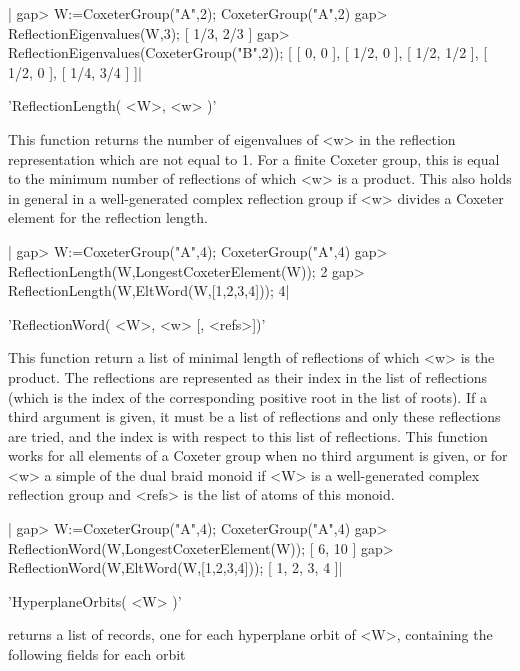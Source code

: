 |    gap> W:=CoxeterGroup("A",2);
    CoxeterGroup("A",2)
    gap> ReflectionEigenvalues(W,3);
    [ 1/3, 2/3 ]
    gap> ReflectionEigenvalues(CoxeterGroup("B",2));
    [ [ 0, 0 ], [ 1/2, 0 ], [ 1/2, 1/2 ], [ 1/2, 0 ], [ 1/4, 3/4 ] ]|


'ReflectionLength( <W>, <w> )'

This  function returns the  number of eigenvalues  of <w> in the reflection
representation  which are not equal to 1.  For a finite Coxeter group, this
is  equal to the minimum  number of reflections of  which <w> is a product.
This  also holds in general in a well-generated complex reflection group if
<w> divides a Coxeter element for the reflection length.

|    gap> W:=CoxeterGroup("A",4);
    CoxeterGroup("A",4)
    gap> ReflectionLength(W,LongestCoxeterElement(W));
    2
    gap> ReflectionLength(W,EltWord(W,[1,2,3,4]));
    4|


'ReflectionWord( <W>, <w> [, <refs>])'

This  function return a list of minimal  length of reflections of which <w>
is  the product. The reflections are represented as their index in the list
of  reflections (which is  the index of  the corresponding positive root in
the  list of roots).  If a third  argument is given,  it must be  a list of
reflections  and only  these reflections  are tried,  and the index is with
respect  to this list of reflections.  This function works for all elements
of  a Coxeter group when no third argument is given, or for <w> a simple of
the  dual braid monoid if <W>  is a well-generated complex reflection group
and <refs> is the list of atoms of this monoid.

|    gap> W:=CoxeterGroup("A",4);
    CoxeterGroup("A",4)
    gap> ReflectionWord(W,LongestCoxeterElement(W));
    [ 6, 10 ]
    gap> ReflectionWord(W,EltWord(W,[1,2,3,4]));
    [ 1, 2, 3, 4 ]|


'HyperplaneOrbits( <W> )'

returns a list of records, one for each hyperplane orbit of <W>,
containing the following fields for each orbit\:

